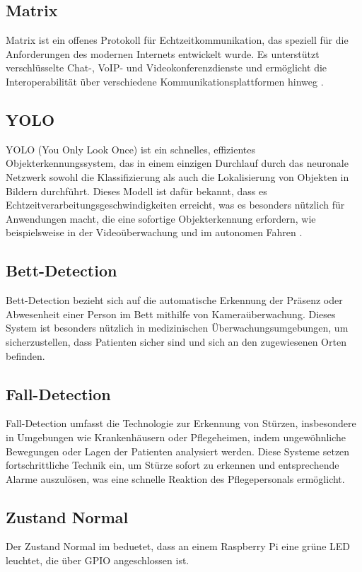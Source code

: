 \subsection{Matrix}
\label{subsec:matrix}
Matrix ist ein offenes Protokoll für Echtzeitkommunikation, das speziell für die Anforderungen des modernen Internets entwickelt wurde. Es unterstützt verschlüsselte Chat-, VoIP- und Videokonferenzdienste und ermöglicht die Interoperabilität über verschiedene Kommunikationsplattformen hinweg \cite{Matrix}.

\subsection{YOLO}
\label{subsec:yolo}
YOLO (You Only Look Once) ist ein schnelles, effizientes Objekterkennungssystem, das in einem einzigen Durchlauf durch das neuronale Netzwerk sowohl die Klassifizierung als auch die Lokalisierung von Objekten in Bildern durchführt. Dieses Modell ist dafür bekannt, dass es Echtzeitverarbeitungsgeschwindigkeiten erreicht, was es besonders nützlich für Anwendungen macht, die eine sofortige Objekterkennung erfordern, wie beispielsweise in der Videoüberwachung und im autonomen Fahren \Cite{Yolo}. 

\subsection{Bett-Detection}
\label{subsec:beddetection}
Bett-Detection bezieht sich auf die automatische Erkennung der Präsenz oder Abwesenheit einer Person im Bett mithilfe von Kameraüberwachung. Dieses System ist besonders nützlich in medizinischen Überwachungsumgebungen, um sicherzustellen, dass Patienten sicher sind und sich an den zugewiesenen Orten befinden.

\subsection{Fall-Detection}
\label{subsec:falldetection}
Fall-Detection umfasst die Technologie zur Erkennung von Stürzen, insbesondere in Umgebungen wie Krankenhäusern oder Pflegeheimen, indem ungewöhnliche Bewegungen oder Lagen der Patienten analysiert werden. Diese Systeme setzen fortschrittliche Technik ein, um Stürze sofort zu erkennen und entsprechende Alarme auszulösen, was eine schnelle Reaktion des Pflegepersonals ermöglicht.

\subsection{Zustand Normal }
\label{subsec:normal}
Der Zustand Normal im beduetet, dass an einem Raspberry Pi eine grüne LED leuchtet, die über GPIO angeschlossen ist. 


